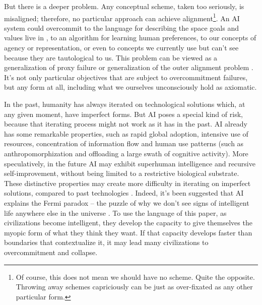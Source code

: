 \documentclass[12pt]{article}
\begin{document}

But there is a deeper problem. Any conceptual scheme, taken too seriously, is misaligned; therefore, no particular approach can achieve alignment\footnote{Of course, this does not mean we should have no scheme. Quite the opposite. Throwing away schemes capriciously can be just as over-fixated as any other particular form.}. An AI system could overcommit to the language for describing the space goals and values live in \citep{bobu2020quantifying, soares2014aligning}, to an algorithm for learning human preferences, to our concepts of agency or representation, or even to concepts we currently use but can't see because they are tautological to us. This problem can be viewed as a generalization of proxy failure \citep{john2023dead} or generalization of the outer alignment problem \citep{hubinger2019risks}. It's not only particular objectives that are subject to overcommitment failures, but any form at all, including what we ourselves unconsciously hold as axiomatic.

In the past, humanity has always iterated on technological solutions which, at any given moment, have imperfect forms. But AI poses a special kind of risk, because that iterating process might not work as it has in the past. AI already has some remarkable properties, such as rapid global adoption, intensive use of resources, concentration of information flow and human use patterns (such as anthropomorphization and offloading a large swath of cognitive activity). More speculatively, in the future AI may exhibit superhuman intelligence and recursive self-improvement, without being limited to a restrictive biological substrate. These distinctive properties may create more difficulty in iterating on imperfect solutions, compared to past technologies \citep{bostrom2014superintelligence}. Indeed, it's been suggested that AI explains the Fermi paradox -- the puzzle of why we don't see signs of intelligent life anywhere else in the universe \citep{garrett2024artificial, bostrom2008wherearethey}. To use the language of this paper, as civilizations become intelligent, they develop the capacity to give themselves the myopic form of what they think they want. If that capacity develops faster than boundaries that contextualize it, it may lead many civilizations to overcommitment and collapse. 

\end{document}
